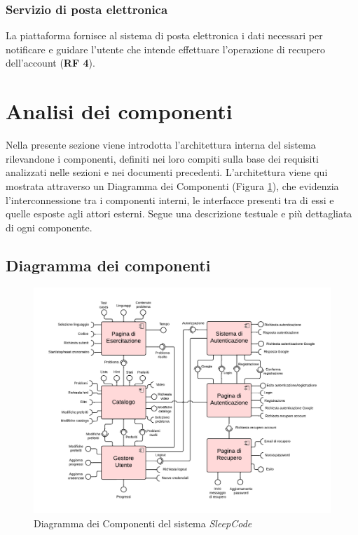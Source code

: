 \documentclass[11pt, a4paper]{article}
\theoremstyle{definition} %
\begin{document}
\subsubsection*{Servizio di posta elettronica}
La piattaforma fornisce al sistema di posta elettronica i dati necessari
per notificare e guidare l'utente che intende effettuare l'operazione di
recupero dell'account (\textbf{RF 4}).



\newpage



\section{Analisi dei componenti}

Nella presente sezione viene introdotta l'architettura interna del sistema
rilevandone i componenti, definiti nei loro compiti sulla base dei requisiti
analizzati nelle sezioni e nei documenti precedenti. L'architettura viene
qui mostrata attraverso un Diagramma dei Componenti (Figura \ref{compdiagram}), che evidenzia
l'interconnessione tra i componenti interni, le interfacce presenti tra di
essi e quelle esposte agli attori esterni. Segue una descrizione testuale
e più dettagliata di ogni componente.

\subsection{Diagramma dei componenti}
\begin{figure}[H]
\centering
\hspace*{-3cm}
\includegraphics[scale = 0.86]{materiale/componentdiagram.pdf}
\caption{Diagramma dei Componenti del sistema \textit{SleepCode}}
\label{compdiagram}
\end{figure}
\end{document}
